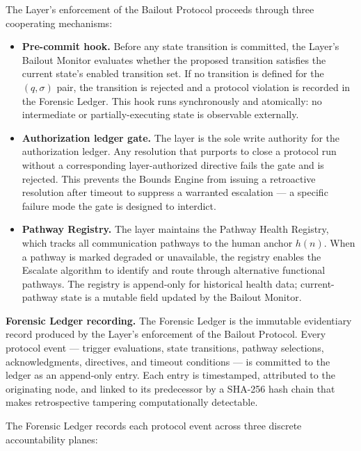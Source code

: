 The \fact{} Layer's enforcement of the Bailout Protocol proceeds through three cooperating mechanisms:

\begin{itemize}\itemsep=0pt
\item[(\textit{i})] \textbf{Pre-commit hook.} Before any state transition is committed, the \fact{} Layer's Bailout Monitor evaluates whether the proposed transition satisfies the current state's enabled transition set. If no transition is defined for the $(q, \sigma)$ pair, the transition is rejected and a protocol violation is recorded in the Forensic Ledger. This hook runs synchronously and atomically: no intermediate or partially-executing state is observable externally.

\item[(\textit{ii})] \textbf{Authorization ledger gate.} The \fact{} layer is the sole write authority for the authorization ledger. Any resolution that purports to close a protocol run without a corresponding \purpose layer-authorized directive fails the gate and is rejected. This prevents the Bounds Engine from issuing a retroactive resolution after timeout to suppress a warranted escalation --- a specific failure mode the gate is designed to interdict.

\item[(\textit{iii})] \textbf{Pathway Registry.} The \fact{} layer maintains the Pathway Health Registry, which tracks all communication pathways to the human anchor $h(n)$. When a pathway is marked degraded or unavailable, the registry enables the Escalate algorithm to identify and route through alternative functional pathways. The registry is append-only for historical health data; current-pathway state is a mutable field updated by the Bailout Monitor.
\end{itemize}

\bigskip
\noindent\textbf{Forensic Ledger recording.} The Forensic Ledger is the immutable evidentiary record produced by the \fact{} Layer's enforcement of the Bailout Protocol. Every protocol event --- trigger evaluations, state transitions, pathway selections, acknowledgments, directives, and timeout conditions --- is committed to the ledger as an append-only entry. Each entry is timestamped, attributed to the originating node, and linked to its predecessor by a SHA-256 hash chain that makes retrospective tampering computationally detectable.

The Forensic Ledger records each protocol event across three discrete accountability planes:

